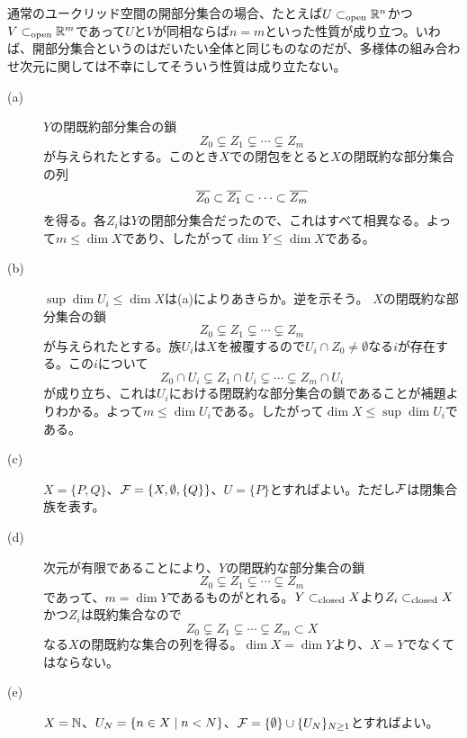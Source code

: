 \begin{rem}
通常のユークリッド空間の開部分集合の場合、たとえば$U \subset_{\text{open}} {\mathbb R}^n$かつ$V \subset_{\text{open}} {\mathbb R}^m$であって$U$と$V$が同相ならば$n=m$といった性質が成り立つ。いわば、開部分集合というのはだいたい全体と同じものなのだが、多様体の組み合わせ次元に関しては不幸にしてそういう性質は成り立たない。
\end{rem}





\begin{description}
  \item[(a)]$Y$の閉既約部分集合の鎖
  \[
  Z_0 \subsetneq Z_1 \subsetneq \cdots \subsetneq Z_m
  \]
  が与えられたとする。このとき$X$での閉包をとると$X$の閉既約な部分集合の列
  \[
  \overline{Z_0} \subset \overline{Z_1} \subset \cdots \subset \overline{Z_m}
  \]
  を得る。各$Z_i$は$Y$の閉部分集合だったので、これはすべて相異なる。よって$m \leq \dim X$であり、したがって$\dim Y \leq \dim X$である。
  \item[(b)]$\sup \dim U_i \leq \dim X$は(a)によりあきらか。逆を示そう。
  $X$の閉既約な部分集合の鎖
  \[
    Z_0 \subsetneq Z_1 \subsetneq \cdots \subsetneq Z_m
  \]
  が与えられたとする。族$U_i$は$X$を被覆するので$U_i \cap Z_0 \neq \emptyset$なる$i$が存在する。この$i$について
  \[
    Z_0 \cap U_i \subsetneq Z_1 \cap U_i \subsetneq \cdots \subsetneq Z_m \cap U_i
  \]
  が成り立ち、これは$U_i$における閉既約な部分集合の鎖であることが補題よりわかる。よって$m \leq \dim U_i$である。したがって$\dim X \leq \sup \dim U_i$である。
  \item[(c)] $X=\{P,Q\}$、$\mathcal{F} = \{ X, \emptyset , \{ Q \}\}$、$U = \{P \}$とすればよい。ただし$\mathcal{F}$は閉集合族を表す。
  \item[(d)] 次元が有限であることにより、$Y$の閉既約な部分集合の鎖
  \[
  Z_0 \subsetneq Z_1 \subsetneq \cdots \subsetneq Z_m
  \]
  であって、$m = \dim Y$であるものがとれる。$Y \subset_{\text{closed}} X$より$Z_i \subset_{\text{closed}} X$かつ$Z_i$は既約集合なので
  \[
  Z_0 \subsetneq Z_1 \subsetneq \cdots \subsetneq Z_m \subset X
  \]
  なる$X$の閉既約な集合の列を得る。$\dim X = \dim Y$より、$X = Y$でなくてはならない。
  \item[(e)]$X = {\mathbb N}$、$U_N = \left\{ n \in X \mathrel{} \middle| \mathrel{} n < N \right\}$、$\mathcal{F} = \{\emptyset \} \cup \{ U_N\}_{N \geq 1}$とすればよい。
\end{description}





